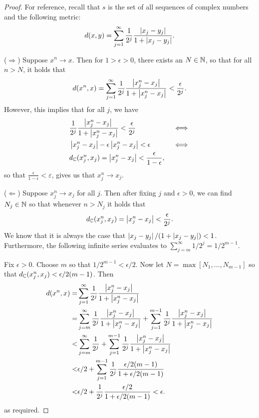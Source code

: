 \begin{proof}
For reference, recall that $s$ is the set of all sequences of complex numbers and the following metric:
\[
d(x,y)=\sum_{j=1}^\infty \frac{1}{2^j}\frac{\left\lvert x_j-y_j\right\rvert}{1+\left\lvert x_j-y_j\right\rvert}.
\]

($\Rightarrow$) Suppose $x^n\to x$. Then for $1>\epsilon>0$, there exists an $N\in\mathbb{N}$, so that for all $n>N$, it holds that
\[
d(x^n,x)=\sum_{j=1}^\infty \frac{1}{2^j}\frac{\left\lvert x^n_j-x_j\right\rvert}{1+\left\lvert x^n_j-x_j\right\rvert}<\frac{\epsilon}{2^j}.
\]
However, this implies that for all $j$, we have
\begin{align*}
    &\frac{1}{2^j}\frac{\left\lvert x^n_j-x_j\right\rvert}{1+\left\lvert x^n_j-x_j\right\rvert} < \frac{\epsilon}{2^j} &&\iff\\
    &\left\lvert x^n_j-x_j\right\rvert-\epsilon\left\lvert x^n_j-x_j\right\rvert < \epsilon &&\iff\\
    &d_{\mathbb{C}}(x^n_j,x_j)=\left\lvert x^n_j-x_j\right\rvert<\frac{\epsilon}{1-\epsilon},
\end{align*}
so that $\frac{\epsilon}{1-\epsilon}<\varepsilon$, gives us that $x^n_j\to x_j$.

($\Leftarrow$) Suppose $x^n_j\to x_j$ for all $j$. Then after fixing $j$ and $\epsilon>0$, we can find $N_j\in\mathbb{N}$ so that whenever $n>N_j$ it holds that
\[
d_{\mathbb{C}}(x^n_j,x_j)=\left\lvert x^n_j-x_j\right\rvert<\frac{\epsilon}{2^j}.
\]
We know that it is always the case that $\left\lvert x_j-y_j\right\rvert/(1+\left\lvert x_j-y_j\right\rvert)<1$. Furthermore, the following infinite series evaluates to $\sum^\infty_{j=m}1/2^j=1/2^{m-1}$.

Fix $\epsilon>0$. Choose $m$ so that $1/2^{m-1}<\epsilon/2$. Now let $N=\max[N_1,\dots,N_{m-1}]$ so that $d_{\mathbb{C}}(x^n_j,x_j)<\epsilon/2(m-1)$. Then
\begin{align*}
    d(x^n,x) =& \sum_{j=1}^\infty \frac{1}{2^j}\frac{\left\lvert x^n_j-x_j\right\rvert}{1+\left\lvert x^n_j-x_j\right\rvert}\\
    =& \sum_{j=m}^\infty \frac{1}{2^j}\frac{\left\lvert x^n_j-x_j\right\rvert}{1+\left\lvert x^n_j-x_j\right\rvert}
    + \sum_{j=1}^{m-1} \frac{1}{2^j}\frac{\left\lvert x^n_j-x_j\right\rvert}{1+\left\lvert x^n_j-x_j\right\rvert}\\
    <& \sum_{j=m}^\infty \frac{1}{2^j}
    + \sum_{j=1}^{m-1} \frac{1}{2^j}\frac{\left\lvert x^n_j-x_j\right\rvert}{1+\left\lvert x^n_j-x_j\right\rvert}\\
    <& \epsilon/2 + \sum_{j=1}^{m-1} \frac{1}{2^j}\frac{\epsilon/2(m-1)}{1+\epsilon/2(m-1)}\\
    <& \epsilon/2 + \frac{1}{2^j}\frac{\epsilon/2}{1+\epsilon/2(m-1)}<\epsilon.
\end{align*}
 as required.
\end{proof}

